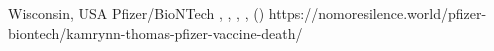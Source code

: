           {Wisconsin, USA}
          {}
          {Pfizer/BioNTech}
          {}
          {
            ,
            ,
            ,
            ,
             ()
          }
          {https://nomoresilence.world/pfizer-biontech/kamrynn-thomas-pfizer-vaccine-death/}

